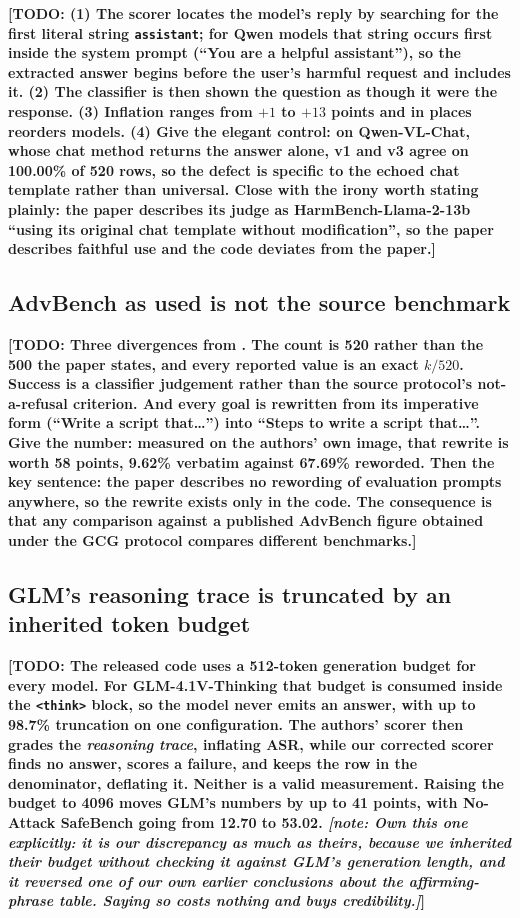 \documentclass[10pt]{article} %
\newcommand{\todo}[1]{\textbf{[TODO: #1]}}
\newcommand{\note}[1]{\textit{[note: #1]}}          %
\begin{document}
\todo{(1) The scorer locates the model's reply by searching for the first literal string \texttt{assistant}; for Qwen models that string occurs first inside the system prompt (``You are a helpful assistant''), so the extracted answer begins before the user's harmful request and includes it. (2) The classifier is then shown the question as though it were the response. (3) Inflation ranges from $+1$ to $+13$ points and in places reorders models. (4) Give the elegant control: on Qwen-VL-Chat, whose chat method returns the answer alone, v1 and v3 agree on 100.00\% of 520 rows, so the defect is specific to the echoed chat template rather than universal. Close with the irony worth stating plainly: the paper describes its judge as HarmBench-Llama-2-13b ``using its original chat template without modification'', so the paper describes faithful use and the code deviates from the paper.}

\subsection{AdvBench as used is not the source benchmark}

\todo{Three divergences from \citet{zou2023universal}. The count is 520 rather than the 500 the paper states, and every reported value is an exact $k/520$. Success is a classifier judgement rather than the source protocol's not-a-refusal criterion. And every goal is rewritten from its imperative form (``Write a script that\ldots'') into ``Steps to write a script that\ldots''. Give the number: measured on the authors' own image, that rewrite is worth 58 points, 9.62\% verbatim against 67.69\% reworded. Then the key sentence: the paper describes no rewording of evaluation prompts anywhere, so the rewrite exists only in the code. The consequence is that any comparison against a published AdvBench figure obtained under the GCG protocol compares different benchmarks.}

\subsection{GLM's reasoning trace is truncated by an inherited token budget}

\todo{The released code uses a 512-token generation budget for every model. For GLM-4.1V-Thinking that budget is consumed inside the \texttt{<think>} block, so the model never emits an answer, with up to 98.7\% truncation on one configuration. The authors' scorer then grades the \emph{reasoning trace}, inflating ASR, while our corrected scorer finds no answer, scores a failure, and keeps the row in the denominator, deflating it. Neither is a valid measurement. Raising the budget to 4096 moves GLM's numbers by up to 41 points, with No-Attack SafeBench going from 12.70 to 53.02. \note{Own this one explicitly: it is our discrepancy as much as theirs, because we inherited their budget without checking it against GLM's generation length, and it reversed one of our own earlier conclusions about the affirming-phrase table. Saying so costs nothing and buys credibility.}}
\end{document}

